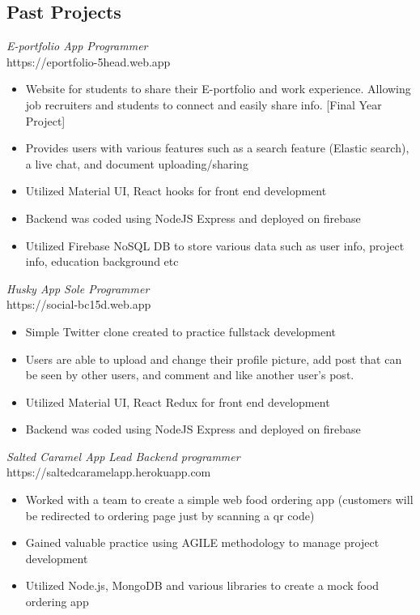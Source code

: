 \documentclass[10pt, a4paper]{cv}
\begin{document}
\begin{paracol}{2}
\begin{flushleft}
		\section*{Past Projects}
		 {\sl E-portfolio App \textbar \space Programmer} \\
		https://eportfolio-5head.web.app
		\begin{itemize} \itemsep -2pt
			\item Website for students to share their E-portfolio and work experience. Allowing job recruiters and students to connect and easily share info. [Final Year Project]
			\item Provides users with various features such as a search feature (Elastic search), a live chat, and document uploading/sharing
			\item Utilized Material UI, React hooks for front end development
			\item Backend was coded using NodeJS Express and deployed on firebase
			\item Utilized Firebase NoSQL DB to store various data such as user info, project info, education background etc
		\end{itemize}
		{\sl Husky App \textbar \space Sole Programmer} \\
		https://social-bc15d.web.app
		\begin{itemize} \itemsep -2pt
			\item Simple Twitter clone created to practice fullstack development
			\item Users are able to upload and change their profile picture, add post that can be seen by other users, and comment and like another user's post.
			\item Utilized Material UI, React Redux for front end development
			\item Backend was coded using NodeJS Express and deployed on firebase
		\end{itemize}
		{\sl Salted Caramel App \textbar \space Lead Backend programmer } \\
		https://saltedcaramelapp.herokuapp.com
		\begin{itemize} \itemsep -2pt
			\item Worked with a team to create a simple web food ordering app (customers will be redirected to ordering page just by scanning a qr code)
			\item Gained valuable practice using AGILE methodology to manage project development
			\item Utilized Node.js, MongoDB and various libraries to create a mock food ordering app
		\end{itemize}


\end{flushleft}
\end{paracol}
\end{document}
